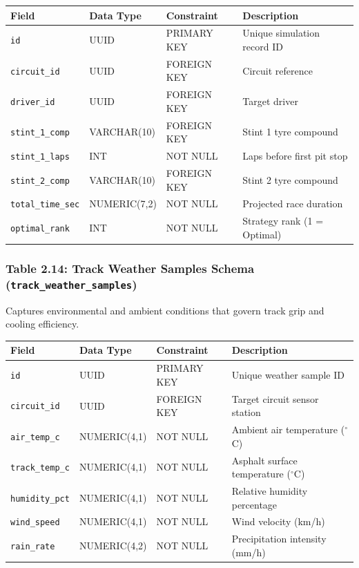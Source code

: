 \documentclass[12pt,a4paper]{report}
\begin{document}
\begin{table}[H]
\centering
\small
\begin{tabularx}{\textwidth}{l p{2.6cm} p{2.6cm} X}
\toprule
\rowcolor{gray!15}
\textbf{Field} & \textbf{Data Type} & \textbf{Constraint} & \textbf{Description} \\
\midrule
\texttt{id} & UUID & PRIMARY KEY & Unique simulation record ID \\
\texttt{circuit\_id} & UUID & FOREIGN KEY & Circuit reference \\
\texttt{driver\_id} & UUID & FOREIGN KEY & Target driver \\
\texttt{stint\_1\_comp} & VARCHAR(10) & FOREIGN KEY & Stint 1 tyre compound \\
\texttt{stint\_1\_laps} & INT & NOT NULL & Laps before first pit stop \\
\texttt{stint\_2\_comp} & VARCHAR(10) & FOREIGN KEY & Stint 2 tyre compound \\
\texttt{total\_time\_sec} & NUMERIC(7,2) & NOT NULL & Projected race duration \\
\texttt{optimal\_rank} & INT & NOT NULL & Strategy rank (1 = Optimal) \\
\bottomrule
\end{tabularx}
\end{table}

\vspace{0.3cm}
\subsubsection*{Table 2.14: Track Weather Samples Schema (\textnormal{\texttt{track\_weather\_samples}})}
Captures environmental and ambient conditions that govern track grip and cooling efficiency.

\begin{table}[H]
\centering
\small
\begin{tabularx}{\textwidth}{l p{2.6cm} p{2.6cm} X}
\toprule
\rowcolor{gray!15}
\textbf{Field} & \textbf{Data Type} & \textbf{Constraint} & \textbf{Description} \\
\midrule
\texttt{id} & UUID & PRIMARY KEY & Unique weather sample ID \\
\texttt{circuit\_id} & UUID & FOREIGN KEY & Target circuit sensor station \\
\texttt{air\_temp\_c} & NUMERIC(4,1) & NOT NULL & Ambient air temperature ($^\circ$C) \\
\texttt{track\_temp\_c} & NUMERIC(4,1) & NOT NULL & Asphalt surface temperature ($^\circ$C) \\
\texttt{humidity\_pct} & NUMERIC(4,1) & NOT NULL & Relative humidity percentage \\
\texttt{wind\_speed} & NUMERIC(4,1) & NOT NULL & Wind velocity (km/h) \\
\texttt{rain\_rate} & NUMERIC(4,2) & NOT NULL & Precipitation intensity (mm/h) \\
\bottomrule
\end{tabularx}
\end{table}
\end{document}
